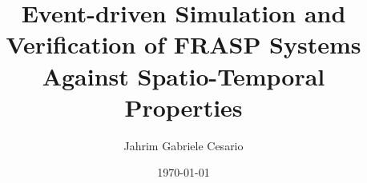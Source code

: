 
\school{\unibo}
\title{
  Event-driven Simulation and Verification of FRASP Systems
  Against Spatio-Temporal Properties
}
\author{Jahrim Gabriele Cesario}
\date{\today}
\subject{Pervasive Computing}
